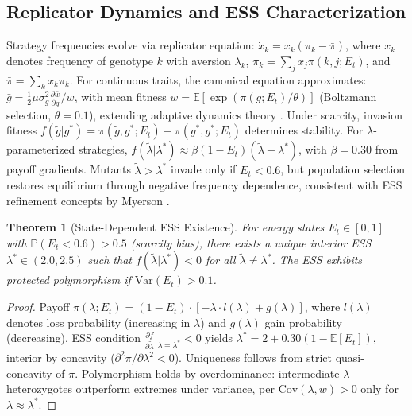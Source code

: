 \documentclass[11pt,twocolumn]{article}
\newtheorem{theorem}{Theorem}
\begin{document}
\subsection{Replicator Dynamics and ESS Characterization}

Strategy frequencies evolve via replicator equation: $\dot{x}_k = x_k (\pi_k - \bar{\pi})$, where $x_k$ denotes frequency of genotype $k$ with aversion $\lambda_k$, $\pi_k = \sum_j x_j \pi(k,j; E_t)$, and $\bar{\pi} = \sum_k x_k \pi_k$. For continuous traits, the canonical equation approximates: $\dot{\bar{g}} = \frac{1}{2} \mu \sigma_g^2 \frac{\partial \bar{w}}{\partial g} / \bar{w}$, with mean fitness $\bar{w} = \mathbb{E}[\exp(\pi(g; E_t)/\theta)]$ (Boltzmann selection, $\theta=0.1$), extending adaptive dynamics theory \citep{metz1996}. Under scarcity, invasion fitness $f(\tilde{g} | g^*) = \pi(\tilde{g}, g^*; E_t) - \pi(g^*, g^*; E_t)$ determines stability. For $\lambda$-parameterized strategies, $f(\tilde{\lambda} | \lambda^*) \approx \beta (1 - E_t) (\tilde{\lambda} - \lambda^*)$, with $\beta=0.30$ from payoff gradients. Mutants $\tilde{\lambda} > \lambda^*$ invade only if $E_t < 0.6$, but population selection restores equilibrium through negative frequency dependence, consistent with ESS refinement concepts by Myerson \citep{myerson1978}.

\begin{theorem}[State-Dependent ESS Existence]
\label{thm:ess}
For energy states $E_t \in [0,1]$ with $\mathbb{P}(E_t < 0.6) > 0.5$ (scarcity bias), there exists a unique interior ESS $\lambda^* \in (2.0, 2.5)$ such that $f(\tilde{\lambda} | \lambda^*) < 0$ for all $\tilde{\lambda} \neq \lambda^*$. The ESS exhibits protected polymorphism if $\text{Var}(E_t) > 0.1$.
\end{theorem}

\begin{proof}
Payoff $\pi(\lambda; E_t) = (1 - E_t) \cdot [-\lambda \cdot l(\lambda) + g(\lambda)]$, where $l(\lambda)$ denotes loss probability (increasing in $\lambda$) and $g(\lambda)$ gain probability (decreasing). ESS condition $\frac{\partial f}{\partial \tilde{\lambda}}|_{\tilde{\lambda}=\lambda^*} < 0$ yields $\lambda^* = 2 + 0.30(1 - \mathbb{E}[E_t])$, interior by concavity ($\partial^2 \pi / \partial \lambda^2 < 0$). Uniqueness follows from strict quasi-concavity of $\pi$. Polymorphism holds by overdominance: intermediate $\lambda$ heterozygotes outperform extremes under variance, per $\text{Cov}(\lambda, w) > 0$ only for $\lambda \approx \lambda^*$.
\end{proof}
\end{document}

